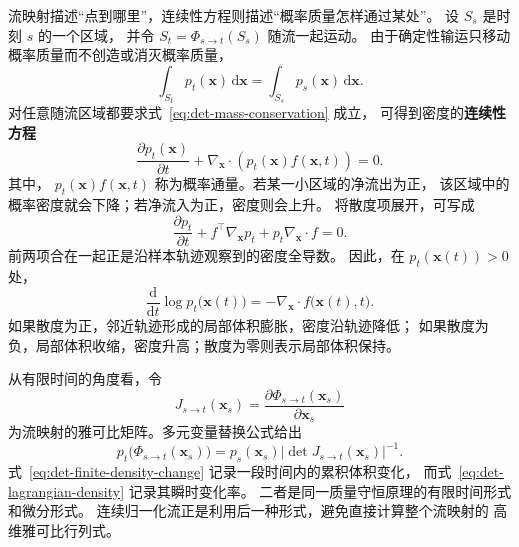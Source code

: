 流映射描述“点到哪里”，连续性方程则描述“概率质量怎样通过某处”。
设 \(S_s\) 是时刻 \(s\) 的一个区域，
并令 \(S_t=\Phi_{s\to t}(S_s)\) 随流一起运动。
由于确定性输运只移动概率质量而不创造或消灭概率质量，
\begin{equation}
    \int_{S_t}p_t(\mathbf{x})\,\mathrm{d}\mathbf{x}
    =
    \int_{S_s}p_s(\mathbf{x})\,\mathrm{d}\mathbf{x}.
    \label{eq:det-mass-conservation}
\end{equation}
对任意随流区域都要求式~\eqref{eq:det-mass-conservation} 成立，
可得到密度的\textbf{连续性方程}
\begin{equation}
    \frac{\partial p_t(\mathbf{x})}{\partial t}
    +
    \nabla_{\mathbf{x}}\cdot
    \left(
        p_t(\mathbf{x})f(\mathbf{x},t)
    \right)
    =
    0.
    \label{eq:det-continuity}
\end{equation}
其中，
\(p_t(\mathbf{x})f(\mathbf{x},t)\)
称为概率通量。若某一小区域的净流出为正，
该区域中的概率密度就会下降；若净流入为正，密度则会上升。
将散度项展开，可写成
\begin{equation}
    \frac{\partial p_t}{\partial t}
    +
    f^\top\nabla_{\mathbf{x}}p_t
    +
    p_t\nabla_{\mathbf{x}}\cdot f
    =
    0.
    \label{eq:det-continuity-expanded}
\end{equation}
前两项合在一起正是沿样本轨迹观察到的密度全导数。
因此，在 \(p_t(\mathbf{x}(t))>0\) 处，
\begin{equation}
    \frac{\mathrm{d}}{\mathrm{d}t}
    \log p_t\bigl(\mathbf{x}(t)\bigr)
    =
    -
    \nabla_{\mathbf{x}}\cdot
    f\bigl(\mathbf{x}(t),t\bigr).
    \label{eq:det-lagrangian-density}
\end{equation}
如果散度为正，邻近轨迹形成的局部体积膨胀，密度沿轨迹降低；
如果散度为负，局部体积收缩，密度升高；散度为零则表示局部体积保持。

从有限时间的角度看，令
\[
    J_{s\to t}(\mathbf{x}_s)
    =
    \frac{\partial\Phi_{s\to t}(\mathbf{x}_s)}
    {\partial\mathbf{x}_s}
\]
为流映射的雅可比矩阵。多元变量替换公式给出
\begin{equation}
    p_t\bigl(\Phi_{s\to t}(\mathbf{x}_s)\bigr)
    =
    p_s(\mathbf{x}_s)
    \left|
        \det J_{s\to t}(\mathbf{x}_s)
    \right|^{-1}.
    \label{eq:det-finite-density-change}
\end{equation}
式~\eqref{eq:det-finite-density-change} 记录一段时间内的累积体积变化，
而式~\eqref{eq:det-lagrangian-density} 记录其瞬时变化率。
二者是同一质量守恒原理的有限时间形式和微分形式。
连续归一化流正是利用后一种形式，避免直接计算整个流映射的
高维雅可比行列式。

